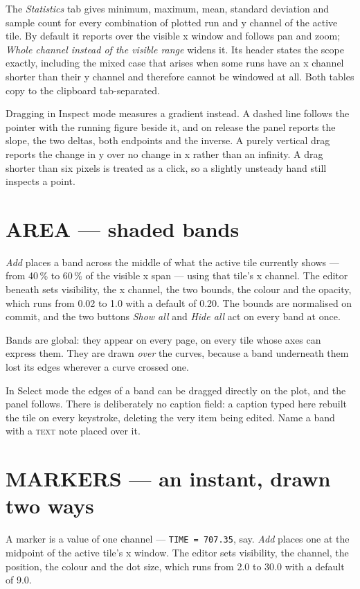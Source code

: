 \documentclass[11pt,a4paper,oneside]{report}
\newcommand{\code}[1]{\texttt{#1}}
\newcommand{\tab}[1]{\textsc{#1}}
\begin{document}
The \emph{Statistics} tab gives minimum, maximum, mean, standard deviation and
sample count for every combination of plotted run and y channel of the active
tile. By default it reports over the visible x window and follows pan and zoom;
\emph{Whole channel instead of the visible range} widens it. Its header states
the scope exactly, including the mixed case that arises when some runs have an x
channel shorter than their y channel and therefore cannot be windowed at all.
Both tables copy to the clipboard tab-separated.

Dragging in Inspect mode measures a gradient instead. A dashed line follows the
pointer with the running figure beside it, and on release the panel reports the
slope, the two deltas, both endpoints and the inverse. A purely vertical drag
reports the change in y over no change in x rather than an infinity. A drag
shorter than six pixels is treated as a click, so a slightly unsteady hand still
inspects a point.

\section{AREA --- shaded bands}

\emph{Add} places a band across the middle of what the active tile currently
shows --- from 40\,\% to 60\,\% of the visible x span --- using that tile's x
channel. The editor beneath sets visibility, the x channel, the two bounds, the
colour and the opacity, which runs from 0.02 to 1.0 with a default of 0.20. The
bounds are normalised on commit, and the two buttons \emph{Show all} and
\emph{Hide all} act on every band at once.

Bands are global: they appear on every page, on every tile whose axes can express
them. They are drawn \emph{over} the curves, because a band underneath them lost
its edges wherever a curve crossed one.

In Select mode the edges of a band can be dragged directly on the plot, and the
panel follows. There is deliberately no caption field: a caption typed here
rebuilt the tile on every keystroke, deleting the very item being edited. Name a
band with a \tab{text} note placed over it.

\section{MARKERS --- an instant, drawn two ways}

A marker is a value of one channel --- \code{TIME = 707.35}, say. \emph{Add}
places one at the midpoint of the active tile's x window. The editor sets
visibility, the channel, the position, the colour and the dot size, which runs
from 2.0 to 30.0 with a default of 9.0.
\end{document}
